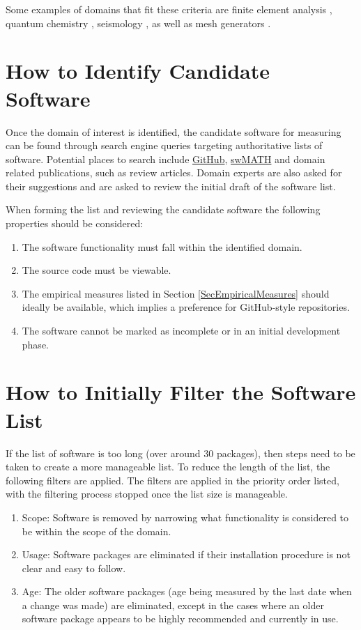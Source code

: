\documentclass[letterpaper,cleveref]{lipics-v2019}
\theoremstyle{definition}
\begin{document}
Some examples of domains that fit these criteria are finite element analysis
\citep{szabo1996finite}, quantum chemistry \citep{veryazov20042molcas},
seismology \citep{SmithEtAl2018}, as well as mesh generators
\citep{smith2016state}.

\section{How to Identify Candidate Software} \label{SecIdentifyCandSoft}

Once the domain of interest is identified, the candidate software for measuring
can be found through search engine queries targeting authoritative lists of
software.  Potential places to search include \href{https://github.com/}
{GitHub}, \href{https://swmath.org/} {swMATH} and domain related publications,
such as review articles. Domain experts are also asked for their suggestions and
are asked to review the initial draft of the software list.  

When forming the list and reviewing the candidate software the following
properties should be considered:

\begin{enumerate}
\item The software functionality must fall within the identified domain.
\item The source code must be viewable.
\item The empirical measures listed in Section \ref{SecEmpiricalMeasures} should
  ideally be available, which implies a preference for GitHub-style repositories.
\item The software cannot be marked as incomplete or in an initial development
  phase.
\end{enumerate}

\section{How to Initially Filter the Software List} \label{SecInitialFilter}

If the list of software is too long (over around 30 packages), then steps need
to be taken to create a more manageable list. To reduce the length of the list,
the following filters are applied.  The filters are applied in the priority
order listed, with the filtering process stopped once the list size is
manageable.

\begin{enumerate}
\item Scope: Software is removed by narrowing what functionality is considered
  to be within the scope of the domain.
\item Usage: Software packages are eliminated if their installation procedure is
  not clear and easy to follow.
\item Age: The older software packages (age being measured by the last date when
  a change was made) are eliminated, except in the cases where an older software
  package appears to be highly recommended and currently in use.
\end{enumerate}
\end{document}
